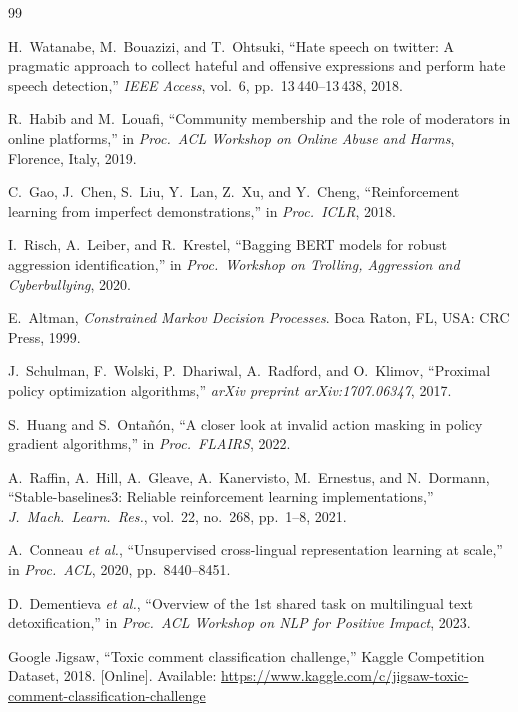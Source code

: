 \documentclass[journal]{IEEEtran}
\begin{document}
\begin{thebibliography}{99}

  H.~Watanabe, M.~Bouazizi, and T.~Ohtsuki,
  ``Hate speech on twitter: A pragmatic approach to collect hateful and offensive
    expressions and perform hate speech detection,''
  \textit{IEEE Access}, vol.~6, pp.~13\,440--13\,438, 2018.

  R.~Habib and M.~Louafi,
  ``Community membership and the role of moderators in online platforms,''
  in \textit{Proc.\ ACL Workshop on Online Abuse and Harms}, Florence, Italy, 2019.

  C.~Gao, J.~Chen, S.~Liu, Y.~Lan, Z.~Xu, and Y.~Cheng,
  ``Reinforcement learning from imperfect demonstrations,''
  in \textit{Proc.\ ICLR}, 2018.

  I.~Risch, A.~Leiber, and R.~Krestel,
  ``Bagging BERT models for robust aggression identification,''
  in \textit{Proc.\ Workshop on Trolling, Aggression and Cyberbullying}, 2020.

  E.~Altman,
  \textit{Constrained Markov Decision Processes}.
  Boca Raton, FL, USA: CRC Press, 1999.

  J.~Schulman, F.~Wolski, P.~Dhariwal, A.~Radford, and O.~Klimov,
  ``Proximal policy optimization algorithms,''
  \textit{arXiv preprint arXiv:1707.06347}, 2017.

  S.~Huang and S.~Onta\~n\'on,
  ``A closer look at invalid action masking in policy gradient algorithms,''
  in \textit{Proc.\ FLAIRS}, 2022.

  A.~Raffin, A.~Hill, A.~Gleave, A.~Kanervisto, M.~Ernestus, and N.~Dormann,
  ``Stable-baselines3: Reliable reinforcement learning implementations,''
  \textit{J.\ Mach.\ Learn.\ Res.}, vol.~22, no.~268, pp.~1--8, 2021.

  A.~Conneau \textit{et al.},
  ``Unsupervised cross-lingual representation learning at scale,''
  in \textit{Proc.\ ACL}, 2020, pp.~8440--8451.

  D.~Dementieva \textit{et al.},
  ``Overview of the 1st shared task on multilingual text detoxification,''
  in \textit{Proc.\ ACL Workshop on NLP for Positive Impact}, 2023.

  Google Jigsaw,
  ``Toxic comment classification challenge,''
  Kaggle Competition Dataset, 2018. [Online].
  Available: \url{https://www.kaggle.com/c/jigsaw-toxic-comment-classification-challenge}


\end{thebibliography}
\end{document}
